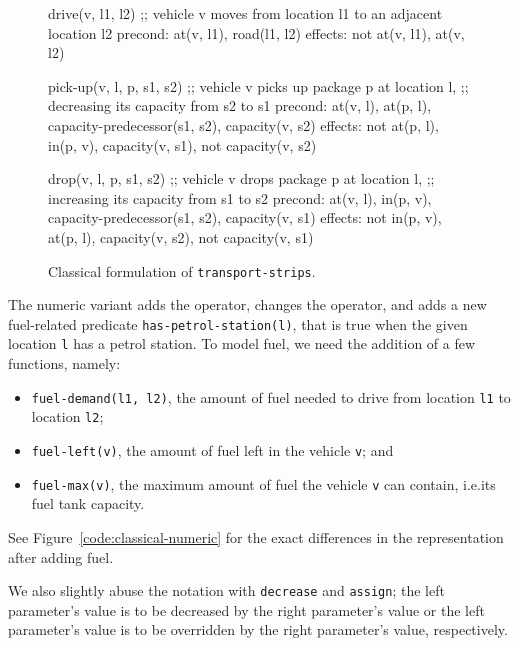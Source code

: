 \begin{figure}[tbp]
\begin{code}
drive(v, l1, l2)
  ;; vehicle v moves from location l1 to an adjacent location l2
  precond: at(v, l1), road(l1, l2)
  effects: not at(v, l1), at(v, l2)

pick-up(v, l, p, s1, s2)
  ;; vehicle v picks up package p at location l,
  ;; decreasing its capacity from s2 to s1
  precond: at(v, l), at(p, l), capacity-predecessor(s1, s2),
           capacity(v, s2)
  effects: not at(p, l), in(p, v), capacity(v, s1),
           not capacity(v, s2)
  
drop(v, l, p, s1, s2)
  ;; vehicle v drops package p at location l,
  ;; increasing its capacity from s1 to s2
  precond: at(v, l), in(p, v), capacity-predecessor(s1, s2),
           capacity(v, s1)
  effects: not in(p, v), at(p, l), capacity(v, s2),
           not capacity(v, s1)
\end{code}
\caption{Classical formulation of \texttt{transport-strips}.}
\label{code:classical-strips}
\end{figure}

The numeric variant  adds the  operator, changes the \drive{}
operator, and adds a new fuel-related predicate \verb+has-petrol-station(l)+, that is true when the given location \verb+l+ has
a petrol station.
To model fuel, we need the addition of a few functions, namely:

\begin{itemize}
\item \verb+fuel-demand(l1, l2)+, the amount of fuel needed to drive
from location \verb+l1+ to location \verb+l2+;
\item \verb+fuel-left(v)+, the amount of fuel left in
the vehicle \verb+v+; and
\item \verb+fuel-max(v)+, the maximum amount of fuel
the vehicle \verb+v+ can contain, i.e.\;its fuel tank capacity.
\end{itemize}
See Figure~\ref{code:classical-numeric} for the exact differences
in the representation after adding fuel.

We also slightly abuse the notation with \verb+decrease+ and \verb+assign+;
the left parameter's value is to be decreased by the right
parameter's value or the left parameter's value is to be overridden
by the right parameter's value, respectively.



